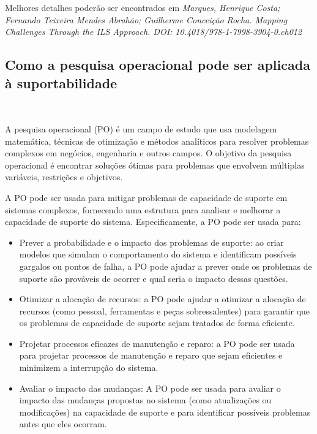 \documentclass{amsart}
\begin{document}
Melhores detalhes poderão ser encontrados em {\it Marques, Henrique Costa; Fernando Teixeira Mendes Abrahão; Guilherme Conceição Rocha. Mapping Challenges Through the ILS Approach. DOI: 10.4018/978-1-7998-3904-0.ch012}

\subsection{Como a pesquisa operacional pode ser aplicada à suportabilidade}\

A pesquisa operacional (PO) é um campo de estudo que usa modelagem matemática, técnicas de otimização e métodos analíticos para resolver problemas complexos em negócios, engenharia e outros campos. O objetivo da pesquisa operacional é encontrar soluções ótimas para problemas que envolvem múltiplas variáveis, restrições e objetivos.

A PO pode ser usada para mitigar problemas de capacidade de suporte em sistemas complexos, fornecendo uma estrutura para analisar e melhorar a capacidade de suporte do sistema. Especificamente, a PO pode ser usada para:

\begin{itemize}
	
\item Prever a probabilidade e o impacto dos problemas de suporte: ao criar modelos que simulam o comportamento do sistema e identificam possíveis gargalos ou pontos de falha, a PO pode ajudar a prever onde os problemas de suporte são prováveis de ocorrer e qual seria o impacto dessas questões.

\item Otimizar a alocação de recursos: a PO pode ajudar a otimizar a alocação de recursos (como pessoal, ferramentas e peças sobressalentes) para garantir que os problemas de capacidade de suporte sejam tratados de forma eficiente.

\item Projetar processos eficazes de manutenção e reparo: a PO pode ser usada para projetar processos de manutenção e reparo que sejam eficientes e minimizem a interrupção do sistema.

\item Avaliar o impacto das mudanças: A PO pode ser usada para avaliar o impacto das mudanças propostas no sistema (como atualizações ou modificações) na capacidade de suporte e para identificar possíveis problemas antes que eles ocorram.

\end{itemize}
\end{document}
